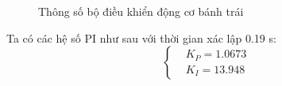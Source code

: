 \begin{itemize}
\begin{figure}[H]
                    \caption{Thông số bộ điều khiển động cơ bánh trái}
                    \label{params_JGB2}
               \end{figure}
               Ta có các hệ số PI như sau với thời gian xác lập 0.19 s:
               \begin{equation*}
                    \begin{cases}
                         &K_P = 1.0673 \\ 
                         &K_I = 13.948
                    \end{cases}
               \end{equation*} 
          \end{itemize}

          

